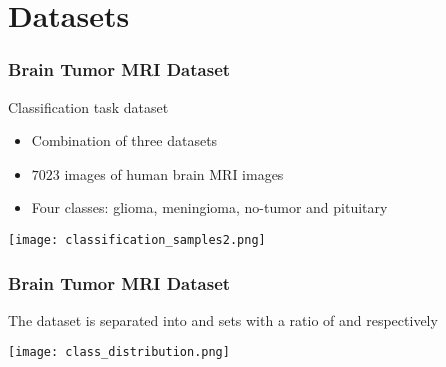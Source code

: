 \documentclass[../presentation.tex]{subfiles} %
\begin{document}
\section{Datasets}

\begin{frame}

    \frametitle{Brain Tumor MRI Dataset}

		Classification task dataset

    \begin{cbox}
        \begin{itemize}
            \item Combination of three datasets
            \item $7023$ images of human brain MRI images
            \item Four classes: glioma, meningioma, no-tumor and pituitary
        \end{itemize}
    \end{cbox}


    \begin{center}
        \texttt{[image: classification\_samples2.png]}
    \end{center}

\end{frame}

\begin{frame}
    
    \frametitle{Brain Tumor MRI Dataset}

    \begin{cbox}
			The dataset is separated into  and  sets
			with a ratio of  and  respectively
    \end{cbox}

    \begin{center}
        \texttt{[image: class\_distribution.png]}
    \end{center}

\end{frame}
\end{document}
